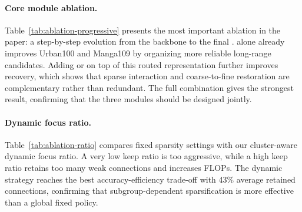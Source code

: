 \paragraph{Core module ablation.}
Table~\ref{tab:ablation-progressive} presents the most important ablation in the paper: a step-by-step evolution from the \baseline{} backbone to the final \method{}. \dpr{} alone already improves Urban100 and Manga109 by organizing more reliable long-range candidates. Adding \pfsa{} or \lmr{} on top of this routed representation further improves recovery, which shows that sparse interaction and coarse-to-fine restoration are complementary rather than redundant. The full combination gives the strongest result, confirming that the three modules should be designed jointly.

\begin{table}[t]
\centering
\caption{Core module ablation under \(\times4\). The three proposed modules contribute cumulatively, and the complete design performs best.}
\label{tab:ablation-progressive}
\end{table}

\paragraph{Dynamic focus ratio.}
Table~\ref{tab:ablation-ratio} compares fixed sparsity settings with our cluster-aware dynamic focus ratio. A very low keep ratio is too aggressive, while a high keep ratio retains too many weak connections and increases FLOPs. The dynamic strategy reaches the best accuracy-efficiency trade-off with 43\% average retained connections, confirming that subgroup-dependent sparsification is more effective than a global fixed policy.


